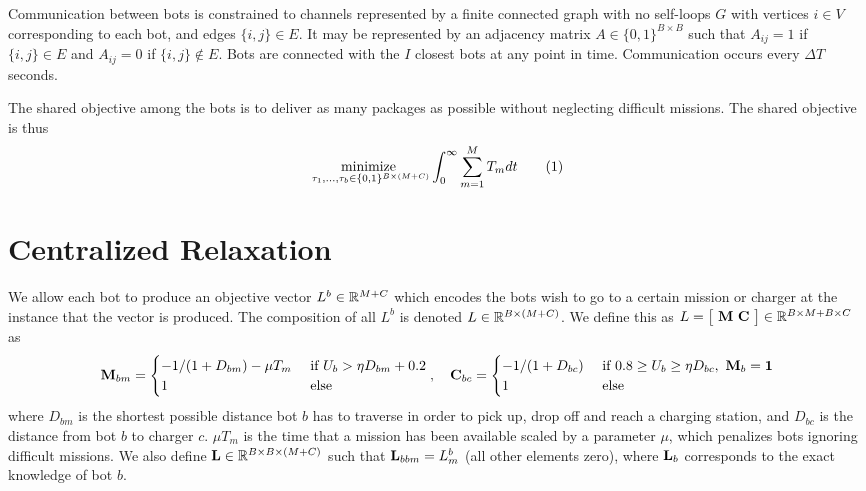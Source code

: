 \documentclass{article}
\newcommand\numberthis{\addtocounter{equation}{1}\tag{\theequation}}
\newcommand{\sectiontype}{}
\begin{document}
 Communication between bots is constrained to channels represented by a finite connected graph with no self-loops $G$ with vertices $i \in V$ corresponding to each bot, and edges $\{i,j\} \in E$. It may be represented by an adjacency matrix $A\in\{0,1\}^{B \times B}$ such that $A_{ij} = 1$ if $\{i,j\}\in E$ and $A_{ij} = 0$ if $\{i,j\}\not\in E$. Bots are connected with the $I$ closest bots at any point in time. Communication occurs every $\Delta T$ seconds. \newline

 The shared objective among the bots is to deliver as many packages as possible without neglecting difficult missions. The shared objective is thus
\begin{align*}
    \underset{\tau_1,...,\tau_b \in \{0,1\}^{B\times(M+C)}}{\text{minimize }}
        \int_0^\infty \sum^{M}_{m=1} T_m dt
        \numberthis \label{eq:shared}
\end{align*}

\section*{Centralized Relaxation}
\renewcommand{\sectiontype}{Centralized Relaxation}
We allow each bot to produce an objective vector $L^{b} \in \mathbb{R}^{M+C}$ which encodes the bots wish to go to a certain mission or charger at the instance that the vector is produced. The composition of all $L^{b}$ is denoted $L\in\mathbb{R}^{B\times(M+C)}$. We define this as $L = \begin{bmatrix}\ \vM\  \vC\  \end{bmatrix} \in \RR^{B \times M + B \times C}$ as
\begin{align*}
    \vM_{bm}
    =
    \begin{cases}
        -1/(1+D_{bm}) - \mu T_m & \text{ if } U_b > \eta D_{bm} + 0.2 \\
        1 & \text{ else }
    \end{cases},\quad
    \vC_{bc}
    =
    \begin{cases}
        -1/(1+D_{bc}) & \text{ if } 0.8 \geq U_b \geq \eta D_{bc},\ \vM_b = \vone \\
        1 & \text{ else }
    \end{cases}
\end{align*}
where $D_{bm}$ is the shortest possible distance bot $b$ has to traverse in order to pick up, drop off and reach a charging station, and $D_{bc}$ is the distance from bot $b$ to charger $c$. $\mu T_m$ is the time that a mission has been available scaled by a parameter $\mu$, which penalizes bots ignoring difficult missions. We also define ${\mathbf{L}} \in \mathbb{R}^{B\times B \times (M+C)}$ such that ${\mathbf{L}}_{bbm} = L^{b}_m$ (all other elements zero), where ${\mathbf{L}}_b$ corresponds to the exact knowledge of bot $b$. \newline
\end{document}
